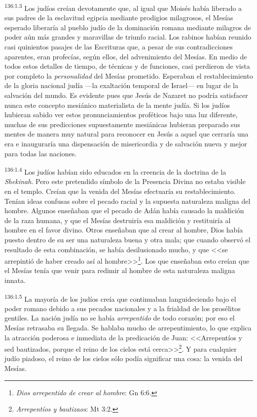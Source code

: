 \par 
\textsuperscript{136:1.3} Los judíos creían devotamente que, al igual que Moisés había liberado a sus padres de la esclavitud egipcia mediante prodigios milagrosos, el Mesías esperado liberaría al pueblo judío de la dominación romana mediante milagros de poder aún más grandes y maravillas de triunfo racial. Los rabinos habían reunido casi quinientos pasajes de las Escrituras que, a pesar de sus contradicciones aparentes, eran profecías, según ellos, del advenimiento del Mesías. En medio de todos estos detalles de tiempo, de técnicas y de funciones, casi perdieron de vista por completo la \textit{personalidad} del Mesías prometido. Esperaban el restablecimiento de la gloria nacional judía ---la exaltación temporal de Israel--- en lugar de la salvación del mundo. Es evidente pues que Jesús de Nazaret no podría satisfacer nunca este concepto mesiánico materialista de la mente judía. Si los judíos hubieran sabido ver estos pronunciamientos proféticos bajo una luz diferente, muchas de sus predicciones supuestamente mesiánicas hubieran preparado sus mentes de manera muy natural para reconocer en Jesús a aquel que cerraría una era e inauguraría una dispensación de misericordia y de salvación nueva y mejor para todas las naciones.

\par 
\textsuperscript{136:1.4} Los judíos habían sido educados en la creencia de la doctrina de la \textit{Shekinah}. Pero este pretendido símbolo de la Presencia Divina no estaba visible en el templo. Creían que la venida del Mesías efectuaría su restablecimiento. Tenían ideas confusas sobre el pecado racial y la supuesta naturaleza maligna del hombre. Algunos enseñaban que el pecado de Adán había causado la maldición de la raza humana, y que el Mesías destruiría esa maldición y restituiría al hombre en el favor divino. Otros enseñaban que al crear al hombre, Dios había puesto dentro de su ser una naturaleza buena y otra mala; que cuando observó el resultado de esta combinación, se había desilusionado mucho, y que <<se arrepintió de haber creado así al hombre>>\footnote{\textit{Dios arrepentido de crear al hombre}: Gn 6:6.}. Los que enseñaban esto creían que el Mesías tenía que venir para redimir al hombre de esta naturaleza maligna innata.

\par 
\textsuperscript{136:1.5} La mayoría de los judíos creía que continuaban languideciendo bajo el poder romano debido a sus pecados nacionales y a la frialdad de los prosélitos gentiles. La nación judía no se había \textit{arrepentido} de todo corazón; por eso el Mesías retrasaba su llegada. Se hablaba mucho de arrepentimiento, lo que explica la atracción poderosa e inmediata de la predicación de Juan: <<Arrepentíos y sed bautizados, porque el reino de los cielos está cerca>>\footnote{\textit{Arrepentíos y bautizaos}: Mt 3:2.}. Y para cualquier judío piadoso, el reino de los cielos sólo podía significar una cosa: la venida del Mesías.

